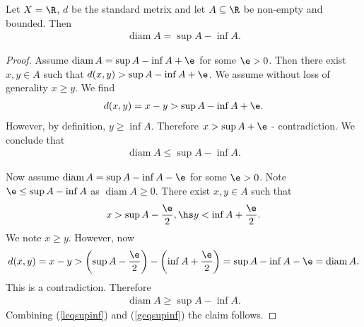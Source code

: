 \documentclass{article}
\DeclareMathOperator{\diam}{diam}
\begin{document}
\begin{claim*}[3]
   Let $X=\R$, $d$ be the standard metrix and let $A\subseteq\R$ be non-empty and bounded. 
   Then 
   \begin{align*}
      \diam A = \sup A - \inf A.
   \end{align*}
   \begin{proof}
      Assume $\diam A = \sup A - \inf A + \e$ for some $\e>0$. Then there exist $x,y\in A$
      such that $d(x,y) > \sup A - \inf A + \e$. We assume without loss of generality 
      $x\geq y$. We find 
      \begin{align*}
         d(x,y) = x - y > \sup A - \inf A + \e.
      \end{align*}
      However, by definition, $y \geq \inf A$. Therefore $x > \sup A + \e$ - contradiction.
      We conclude that
      \begin{align}
         \label{leqsupinf} 
         \diam A \leq \sup A - \inf A.
      \end{align} 

      Now assume $\diam A = \sup A - \inf A - \e$ for some $\e > 0$. Note $\e \leq \sup A
      - \inf A$ as $\diam A \geq 0$. There exist $x,y\in A$ such that 
      \begin{align*}
         x > \sup A - \frac{\e}{2}, \hs 
         y < \inf A + \frac{\e}{2}.
      \end{align*}
      We note $x\geq y$. However, now
      \begin{align*}
         d(x,y) 
         = x-y 
         > \left(\sup A - \frac{\e}{2}\right) - \left(\inf A + \frac{\e}{2}\right) 
         = \sup A - \inf A - \e
         = \diam A.
      \end{align*}
      This is a contradiction. Therefore 
      \begin{align}
         \label{geqsupinf}
         \diam A \geq \sup A - \inf A.
      \end{align}
      Combining (\ref{leqsupinf}) and (\ref{geqsupinf}) the claim follows.
   \end{proof}
\end{claim*}
\end{document}

